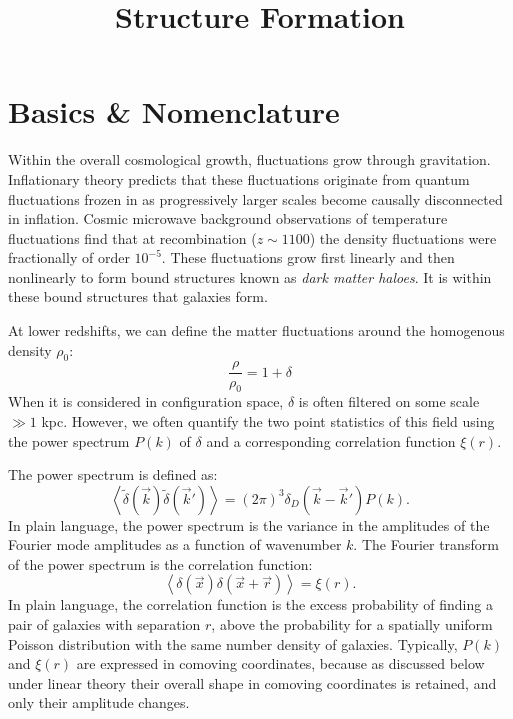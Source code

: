 \title{\bf Structure Formation}

\section{Basics \& Nomenclature}

Within the overall cosmological growth, fluctuations grow through
gravitation. Inflationary theory predicts that these fluctuations
originate from quantum fluctuations frozen in as progressively larger
scales become causally disconnected in inflation. Cosmic microwave
background observations of temperature fluctuations find that at
recombination ($z\sim 1100$) the density fluctuations were
fractionally of order $10^{-5}$. These fluctuations grow first
linearly and then nonlinearly to form bound structures known as {\it
  dark matter haloes}. It is within these bound structures that
galaxies form.

At lower redshifts, we can define the matter fluctuations around the
homogenous density $\rho_0$:
\begin{equation}
\frac{\rho}{\rho_0} = 1+ \delta
\end{equation}
When it is considered in configuration space, $\delta$ is often
filtered on some scale $\gg 1$ kpc.  However, we often quantify the
two point statistics of this field using the power spectrum $P(k)$ of
$\delta$ and a corresponding correlation function $\xi(r)$.

The power spectrum is defined as:
\begin{equation}
\left\langle \tilde\delta(\vec{k}) \tilde\delta(\vec{k}') \right\rangle
= (2\pi)^3 \delta_D\left(\vec{k} - \vec{k}'\right) P(k).
\end{equation}
In plain language, the power spectrum is the variance in the
amplitudes of the Fourier mode amplitudes as a function of wavenumber
$k$. The Fourier transform of the power spectrum is the correlation
function:
\begin{equation}
\left\langle\delta\left(\vec{x}\right) \delta\left(\vec{x}
+ \vec{r} \right) \right\rangle = \xi(r).
\end{equation}
In plain language, the correlation function is the excess probability
of finding a pair of galaxies with separation $r$, above the
probability for a spatially uniform Poisson distribution with the same
number density of galaxies.  Typically, $P(k)$ and $\xi(r)$ are
expressed in comoving coordinates, because as discussed below under
linear theory their overall shape in comoving coordinates is retained,
and only their amplitude changes.

